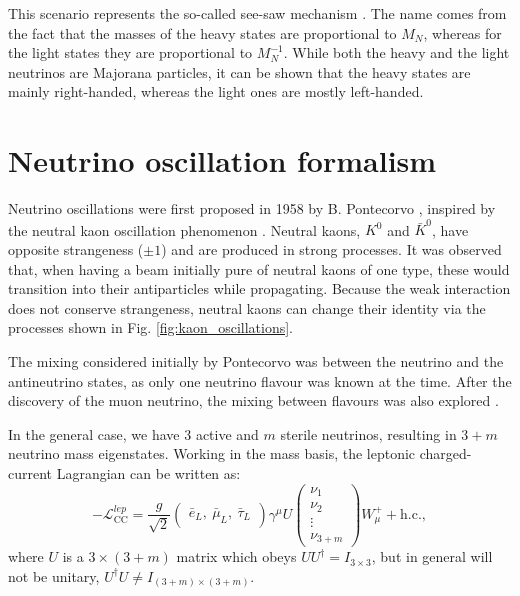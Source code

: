 This scenario represents the so-called see-saw mechanism \cite{Minkowski1977,Gell-Mann1979,Yanagida1979,Mohapatra1979,Schechter1980}. The name comes from the fact that the masses of the heavy states are proportional to $M_{N}$, whereas for the light states they are proportional to $M_{N}^{-1}$. While both the heavy and the light neutrinos are Majorana particles, it can be shown that the heavy states are mainly right-handed, whereas the light ones are mostly left-handed.

\section{Neutrino oscillation formalism}

Neutrino oscillations were first proposed in 1958 by B. Pontecorvo \cite{Pontecorvo1957a}, inspired by the neutral kaon oscillation phenomenon \cite{Gell-Mann1955}. Neutral kaons, $K^{0}$ and $\bar{K}^{0}$, have opposite strangeness ($\pm 1$) and are produced in strong processes. It was observed that, when having a beam initially pure of neutral kaons of one type, these would transition into their antiparticles while propagating. Because the weak interaction does not conserve strangeness, neutral kaons can change their identity via the processes shown in Fig. \ref{fig:kaon_oscillations}.

The mixing considered initially by Pontecorvo was between the neutrino and the antineutrino states, as only one neutrino flavour was known at the time. After the discovery of the muon neutrino, the mixing between flavours was also explored \cite{Pontecorvo1967}.

In the general case, we have $3$ active and $m$ sterile neutrinos, resulting in $3+m$ neutrino mass eigenstates. Working in the mass basis, the leptonic charged-current Lagrangian can be written as:
\begin{equation}
	-\mathcal{L}_{\mathrm{CC}}^{lep} = \frac{g}{\sqrt{2}} \begin{pmatrix}\bar{e}_{L},~ \bar{\mu}_{L},~ \bar{\tau}_{L}\end{pmatrix} \gamma^{\mu} U \begin{pmatrix}\nu_{1}\\\nu_{2}\\\vdots\\\nu_{3+m}\end{pmatrix} W_{\mu}^{+} + \mathrm{h.c.},
\end{equation}
where $U$ is a $3\times(3+m)$ matrix which obeys $UU^{\dagger} = I_{3 \times 3}$, but in general will not be unitary, $U^{\dagger}U\neq I_{(3+m) \times (3+m)}$.

